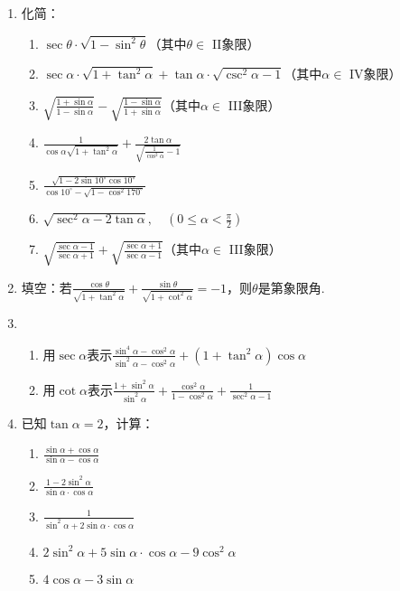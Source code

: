 \begin{enumerate}
\item 化简：
\begin{enumerate}[(1)]
    \item $\sec\theta \cdot \sqrt{1-\sin^2\theta}$（其中$\theta\in $ II象限）
    \item $\sec\alpha\cdot \sqrt{1+\tan^2\alpha}+\tan\alpha\cdot \sqrt{\csc^2\alpha-1}$（其中$\alpha\in $ IV象限）
    \item $\sqrt{\frac{1+\sin\alpha}{1-\sin\alpha}}-\sqrt{\frac{1-\sin\alpha}{1+\sin\alpha}}$（其中$\alpha\in $ III象限）
    \item $\frac{1}{\cos\alpha \sqrt{1+\tan^2\alpha}}+\frac{2\tan\alpha}{\sqrt{\frac{1}{\cos^2\alpha}-1}}$
    \item $\frac{\sqrt{1-2\sin10^{\circ}\cos10^{\circ}}}{\cos10^{\circ}-\sqrt{1-\cos^2 170^{\circ}}}$
    \item $\sqrt{\sec^2\alpha-2\tan\alpha},\quad \left(0\le \alpha<\frac{\pi}{2}\right)$
    \item $\sqrt{\frac{\sec\alpha-1}{\sec\alpha+1}}+\sqrt{\frac{\sec\alpha+1}{\sec\alpha-1}}$（其中$\alpha\in $ III象限）
\end{enumerate}

\item 填空：若$\frac{\cos\theta}{\sqrt{1+\tan^2\alpha}}+\frac{\sin\theta}{\sqrt{1+\cot^2\alpha}}=-1$，则$\theta$是第\underline{\qquad }象限角.
\item \begin{enumerate}[(1)]
    \item 用$\sec\alpha$表示$\frac{\sin^4\alpha-\cos^2\alpha}{\sin^2\alpha-\cos^2\alpha}+(1+\tan^2\alpha)\cos\alpha$
    \item 用$\cot\alpha$表示$\frac{1+\sin^2\alpha}{\sin^2\alpha}+\frac{\cos^2\alpha}{1-\cos^2\alpha}+\frac{1}{\sec^2\alpha-1}$
\end{enumerate}

\item 已知$\tan\alpha=2$，计算：
\begin{multicols}{2}
    \begin{enumerate}[(1)]
    \item $\frac{\sin\alpha+\cos\alpha}{\sin\alpha-\cos\alpha}$
    \item $\frac{1-2\sin^2\alpha}{\sin\alpha\cdot \cos\alpha}$
    \item $\frac{1}{\sin^2\alpha+2\sin\alpha\cdot \cos\alpha}$
    \item $2\sin^2\alpha +5\sin\alpha\cdot \cos\alpha-9\cos^2\alpha$
    \item $4\cos\alpha-3\sin\alpha$
\end{enumerate}
\end{multicols}


\end{enumerate}
